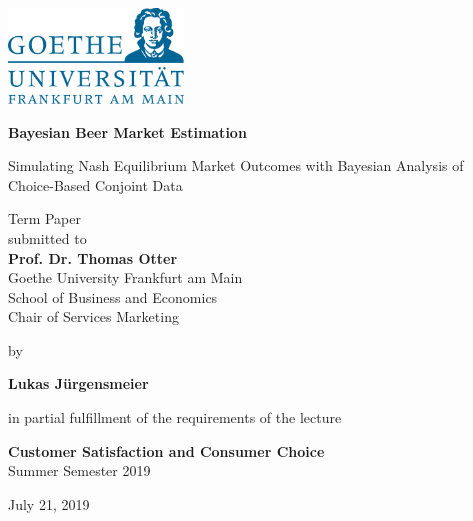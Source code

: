 \documentclass[12pt,a4paper]{article}
\begin{document}
\begin{center}
 \includegraphics[width=0.35\textwidth]{GU-Logo-blau-CMYK.eps} \vspace{2cm}

 {\Large{\bf Bayesian Beer Market Estimation}} \medskip

  {\Large{Simulating Nash Equilibrium Market Outcomes with Bayesian Analysis of Choice-Based Conjoint Data}} \vspace{3cm}  

  Term Paper \\\vspace{2cm}
  submitted to \\\vspace{0.5cm}
  \textbf{Prof. Dr. Thomas Otter} \\\vspace{0.5cm}
  Goethe University Frankfurt am Main \\
  School of Business and Economics \\
  Chair of Services Marketing \vspace{1.5cm}
  
  by \medskip

  \textbf{Lukas J\"urgensmeier} \\
  
  \bigskip

  in partial fulfillment of the requirements of the lecture \medskip

 {\bf Customer Satisfaction and Consumer Choice} \\
  Summer Semester 2019\\
  \medskip

  July 21, 2019
  
\end{center}


\pagebreak
\pagestyle{plain}
\tableofcontents
\pagebreak
\listoffigures
\listoftables
\renewcommand\lstlistlistingname{List of R Code Chunks}
\lstlistoflistings
\newpage
\setcounter{page}{2}
\setlength{\baselineskip}{1.5\baselineskip}
\pagestyle{plain}
\end{document}
